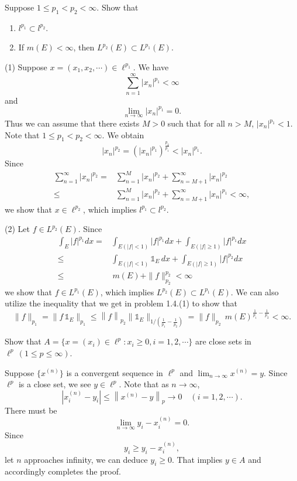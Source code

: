 \documentclass[12pt,letterpaper,boxed]{hmcpset}
\begin{document}
\begin{problem}[1.6]
	Suppose $1\le p_1<p_2<\infty$. Show that
	\begin{enumerate}[(1)]
		\item $l^{p_1}\subset l^{p_2}$.
		\item If $m(E)<\infty$, then $L^{p_2}(E)\subset L^{p_1}(E)$.
	\end{enumerate}
\end{problem}
\begin{solution}
	(1) Suppose $x=(x_1,x_2,\cdots)\in \ell^{p_1}$. We have
	\[
		\sum_{n=1}^\infty |x_n|^{p_1}<\infty
	\]
	and
	\[
		\lim_{n\to\infty}|x_n|^{p_1}=0.
	\]
	Thus we can assume that there exists $M>0$ such that for all $n>M$, $|x_n|^{p_1}<1$. Note that $1\le p_1< p_2<\infty$. We obtain 
	\[
		|x_n|^{p_2}=\left(|x_n|^{p_1}\right)^{\frac{p_2}{p_1}}<|x_n|^{p_1}.
	\]
	Since
	\begin{align*}
		\sum_{n=1}^{\infty}\left|x_{n}\right|^{p_{2}}=&\sum_{n=1}^{M}\left|x_{n}\right|^{p_{2}}+\sum_{n=M+1}^{\infty}\left|x_{n}\right|^{p_{2}}\\
		\leqslant& \sum_{n=1}^{M}\left|x_{n}\right|^{p_{2}}+\sum_{n=M+1}^{\infty}\left|x_{n}\right|^{p_{1}}<\infty,
	\end{align*}
	we show that $x\in\ell^{p_2}$, which implies  $l^{p_1}\subset l^{p_2}$.

	\noindent (2) Let $f\in L^{p_2}(E)$. Since
	\begin{align*}
		\int_{E}\left|f\right|^{p_1}dx=&\int_{E(|f|<1)}\left|f\right|^{p_1}dx+\int_{E\left(|f|\ge 1\right)}\left|f\right|^{p_1}dx\\
		\le&\int_{E(|f|<1)}\mathbb{1}_E\,dx+\int_{E\left(|f|\ge 1\right)}\left|f\right|^{p_2}dx\\
		\le&\,m\left(E\right)+\|f\|_{p_2}^{p_2}<\infty
	\end{align*}
	we show that $f\in L^{p_1}(E)$, which implies $L^{p_2}(E)\subset L^{p_1}(E)$. We can also utilize the inequality that we get in problem 1.4.(1) to show that
	\[
		\|f\|_{p_1}=\|f\,\mathbb{1}_E\|_{p_1}\le \left\|f\right\|_{p_2}\|\mathbb{1}_E\|_{1/\left(\frac{1}{p_1}-\frac{1}{p_2}\right)}=\|f\|_{p_2}\,m(E)^{\frac{1}{p_1}-\frac{1}{p_2}}<\infty.
	\]

\end{solution}

\begin{problem}[1.9]
	Show that $A=\{x=(x_i)\in\ell^p:x_i\ge0,i=1,2,\cdots\}$ are close sets in $\ell^p\,(1\le p\le \infty)$.
\end{problem}
\begin{solution}
	Suppose $\{x^{(n)}\}$ is a convergent sequence in $\ell^p$ and $\lim_{n\to\infty}x^{(n)}=y$. Since $\ell^p$ is a close set, we see $y\in\ell^p$. Note that as $n\to\infty$,
	\[
		\left|x^{(n)}_i-y_i\right|\le\left\|x^{(n)}-y\right\|_p\to0\quad(i=1,2,\cdots).
	\]
	There must be 
	\[
		\lim_{n\to\infty}y_i-x^{(n)}_i= 0.
	\]
	Since
	\[
		y_i\ge y_i-x^{(n)}_i,
	\]
	let $n$ approaches infinity, we can deduce $y_i\ge0$. That implies $y\in A$ and accordingly completes the proof.
\end{solution}
\end{document}
